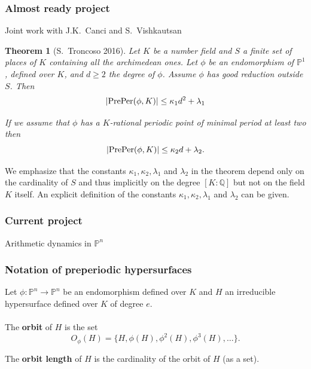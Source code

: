 \documentclass{beamer}
\def\PP{{\mathbb P}}
\theoremstyle{thmstyle}
\theoremstyle{thmstyle}
\newtheorem*{mythm}{Theorem}
\theoremstyle{mystyle}
\theoremstyle{qstnstyle}
\begin{document}
\begin{frame}
\frametitle{Almost ready project}
Joint work with J.K.\ Canci and S.\ Vishkautsan \\
\pause
\begin{mythm}[S.\ Troncoso 2016]
Let $K$ be a number field and $S$ a finite set of places of $K$ containing all the archimedean ones. 
Let $\phi$ be an endomorphism of $\PP^1$, defined over $K$, and $d\geq 2$ the degree of $\phi$. Assume $\phi$ has good reduction outside $S$. Then 
$$|{\rm PrePer}(\phi,K)| \leq \kappa_1 d^2+\lambda_1$$

If we assume that $\phi$ has a $K$-rational periodic point of minimal period at least two then
$$|{\rm PrePer}(\phi,K)| \leq \kappa_2 d+\lambda_2.$$
\end{mythm}
\pause 

We emphasize that the constants $\kappa_1,\kappa_2,\lambda_1$ and $\lambda_2$ in the theorem depend only on the cardinality of $S$ and thus implicitly on the degree $[K:\mathbb{Q}]$ but not on the field $K$ itself. An explicit definition of the constants $\kappa_1,\kappa_2,\lambda_1$ and $\lambda_2$ can be given.
\end{frame}


\begin{frame}
\frametitle{Current project}

\Huge{Arithmetic dynamics in $\PP^n$}
\end{frame}




\begin{frame}
\frametitle{Notation of preperiodic hypersurfaces}
\pause
Let $\phi:\mathbb{P}^n\to\mathbb{P}^n$ be an endomorphism defined over $K$ and $H$ an irreducible hypersurface defined over $K$ of degree $e$.
\\\quad\\
\pause
The \textbf{orbit} of $H$ is the set 
$$ O_{\phi}(H) = \{H, \phi(H),\phi^2(H),\phi^3(H),\ldots \}.$$

\pause The \textbf{orbit length} of $H$ is the cardinality of the orbit of $H$ (as a set).
\end{frame}
\end{document}
